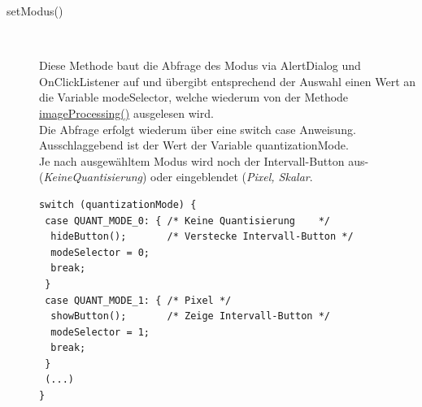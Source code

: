 \begin{description}
\item[setModus()]~\par
\label{setModus}
Diese Methode baut die Abfrage des Modus via AlertDialog und OnClickListener auf und übergibt entsprechend der Auswahl einen Wert an die Variable \textcolor{lila}{modeSelector}, welche wiederum von der Methode \hyperref[imageProcessing]{imageProcessing()} ausgelesen wird.\\
Die Abfrage erfolgt wiederum über eine switch case Anweisung. Ausschlaggebend ist der Wert der Variable \textcolor{lila}{quantizationMode}.\\
Je nach ausgewähltem Modus wird noch der Intervall-Button aus- (\textit{KeineQuantisierung}) oder eingeblendet (\textit{Pixel, Skalar}.
\begin{lstlisting}
switch (quantizationMode) {
 case QUANT_MODE_0: { /* Keine Quantisierung	*/
  hideButton();       /* Verstecke Intervall-Button */
  modeSelector = 0;
  break;
 }
 case QUANT_MODE_1: { /* Pixel */
  showButton();       /* Zeige Intervall-Button */
  modeSelector = 1;
  break;
 }
 (...)
}
\end{lstlisting}


\end{description}

